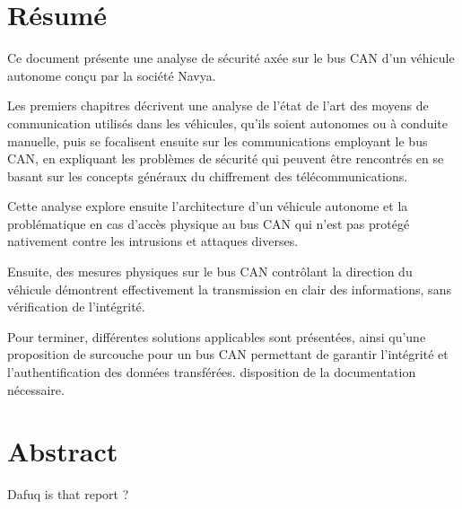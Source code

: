 \chapter{Résumé}
Ce document présente une analyse de sécurité axée sur le bus CAN d'un véhicule autonome conçu par la société Navya.

Les premiers chapitres décrivent une analyse de l'état de l'art des moyens de communication utilisés dans les véhicules, qu'ils soient autonomes ou à conduite manuelle, puis se focalisent ensuite sur les communications employant le bus CAN, en expliquant les problèmes de sécurité qui peuvent être rencontrés en se basant sur les concepts généraux du chiffrement des télécommunications. 

Cette analyse explore ensuite l'architecture d'un véhicule autonome et la problématique en cas d'accès physique au bus CAN qui n'est pas protégé nativement contre les intrusions et attaques diverses.

Ensuite, des mesures physiques sur le bus CAN contrôlant la direction du véhicule démontrent effectivement la transmission en clair des informations, sans vérification de l'intégrité.

Pour terminer, différentes solutions applicables sont présentées, ainsi qu'une proposition de surcouche pour un bus CAN permettant de garantir l'intégrité et l'authentification des données transférées.
disposition de la documentation nécessaire.

{\let\clearpage\relax\par \chapter{Abstract}}
Dafuq is that report ?